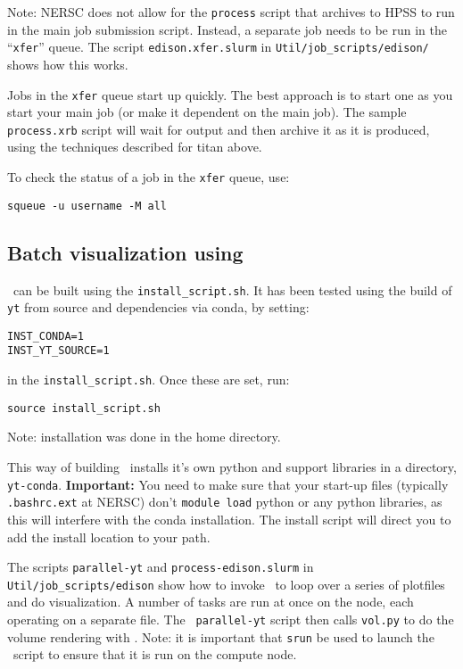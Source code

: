 Note: NERSC does not allow for the {\tt process} script that archives
to HPSS to run in the main job submission script.  Instead, a separate
job needs to be run in the ``{\tt xfer}'' queue.  The script {\tt edison.xfer.slurm} 
in {\tt Util/job\_scripts/edison/} shows how this works.  

Jobs in the {\tt xfer} queue start up quickly.  The best approach is
to start one as you start your main job (or make it dependent on the
main job).  The sample {\tt process.xrb} script will wait for output
and then archive it as it is produced, using the techniques described
for titan above.

To check the status of a job in the {\tt xfer} queue, use:
\begin{verbatim}
squeue -u username -M all
\end{verbatim}


\subsection{Batch visualization using \yt}

\yt\ can be built using the {\tt install\_script.sh}.  It has been
tested using the build of {\tt yt} from source and dependencies via conda,
by setting:
\begin{verbatim}
INST_CONDA=1
INST_YT_SOURCE=1
\end{verbatim}
in the {\tt install\_script.sh}.  Once these are set, run:
\begin{verbatim}
source install_script.sh
\end{verbatim}
Note: installation was done in the home directory.

This way of building \yt\ installs it's own python and support
libraries in a directory, {\tt yt-conda}.  {\bf Important: } You need
to make sure that your start-up files (typically {\tt .bashrc.ext} at
NERSC) don't {\tt module load} python or any python libraries, as this
will interfere with the conda installation.  The install script will
direct you to add the install location to your path.


The scripts {\tt parallel-yt} and {\tt process-edison.slurm} in {\tt
  Util/job\_scripts/edison} show how to invoke \yt\ to loop over a
series of plotfiles and do visualization.  A number of tasks are run
at once on the node, each operating on a separate file.  The {\tt
  parallel-yt} script then calls {\tt vol.py} to do the volume
rendering with \yt.  Note: it is important that {\tt srun} be used to
launch the \yt\ script to ensure that it is run on the compute node.

